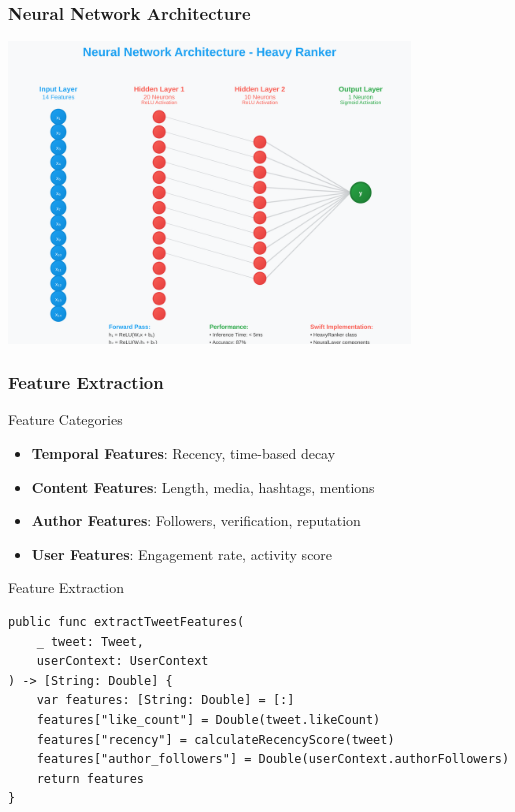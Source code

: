 \documentclass[aspectratio=169]{beamer}
\begin{document}
\begin{frame}
    \frametitle{Neural Network Architecture}
    \begin{center}
        \includegraphics[width=0.8\textwidth]{images/neural-network.svg}
    \end{center}
\end{frame}

\begin{frame}
    \frametitle{Feature Extraction}
    \begin{block}{Feature Categories}
        \begin{itemize}
            \item \textbf{Temporal Features}: Recency, time-based decay
            \item \textbf{Content Features}: Length, media, hashtags, mentions
            \item \textbf{Author Features}: Followers, verification, reputation
            \item \textbf{User Features}: Engagement rate, activity score
        \end{itemize}
    \end{block}
    
    \begin{block}{Feature Extraction}
        \begin{verbatim}
public func extractTweetFeatures(
    _ tweet: Tweet, 
    userContext: UserContext
) -> [String: Double] {
    var features: [String: Double] = [:]
    features["like_count"] = Double(tweet.likeCount)
    features["recency"] = calculateRecencyScore(tweet)
    features["author_followers"] = Double(userContext.authorFollowers)
    return features
}
        \end{verbatim}
    \end{block}
\end{frame}
\end{document}
